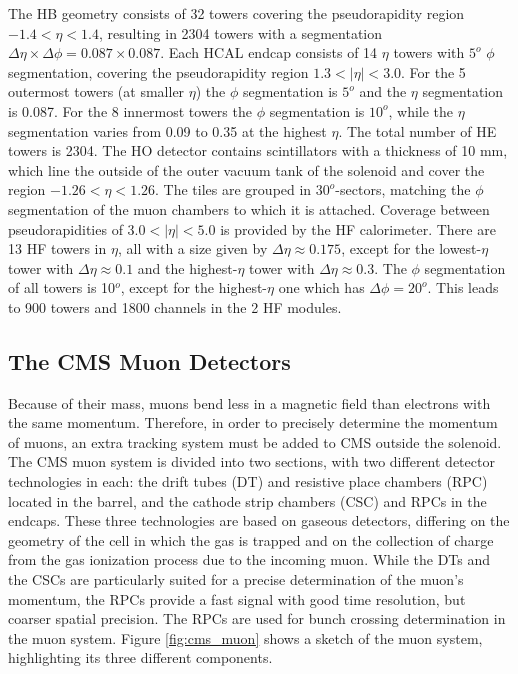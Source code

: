 The HB geometry consists of 32 towers covering the pseudorapidity region $-1.4 < \eta < 1.4$, resulting in 2304 towers with a segmentation $\Delta\eta\times\Delta\phi = 0.087\times0.087$.
Each HCAL endcap consists of 14 $\eta$ towers with $5^{o}$ $\phi$ segmentation, covering the pseudorapidity region $1.3 < |\eta| < 3.0$. 
For the 5 outermost towers (at smaller $\eta$) the $\phi$ segmentation is $5^{o}$ and the $\eta$ segmentation is 0.087. For the 8 innermost towers the $\phi$ segmentation is $10^{o}$, while the $\eta$ segmentation varies from 0.09 to 0.35 at the highest $\eta$. The total number of HE towers is 2304.
The HO detector contains scintillators with a thickness of 10 mm, which line the outside of the outer vacuum tank of the solenoid and cover the region $-1.26 < \eta < 1.26$. The tiles are grouped in $30^{o}$-sectors, matching the $\phi$ segmentation of the muon chambers to which it is attached. 
Coverage between pseudorapidities of $3.0 < |\eta| < 5.0$ is provided by the HF calorimeter. 
There are 13 HF towers in $\eta$, all with a size given by $\Delta\eta\approx0.175$, except for the lowest-$\eta$ tower with $\Delta\eta\approx0.1$ and the highest-$\eta$ tower with $\Delta\eta\approx0.3$. 
The $\phi$ segmentation of all towers is 10$^{o}$, except for the highest-$\eta$ one which has $\Delta\phi= 20^{o}$. 
This leads to 900 towers and 1800 channels in the 2 HF modules.

\subsection{The CMS Muon Detectors}

Because of their mass, muons bend less in a magnetic field than electrons with the same momentum. 
Therefore, in order to precisely determine the momentum of muons, an extra tracking system must be added to CMS outside the solenoid. 
The CMS muon system is divided into two sections, with two different detector technologies in each: the drift tubes (DT) and resistive place chambers (RPC) located in the barrel, and the cathode strip chambers (CSC) and RPCs in the endcaps. 
These three technologies are based on gaseous detectors, differing on the geometry of the cell in which the gas is trapped and on the collection of charge from the gas ionization process due to the incoming muon. 
While the DTs and the CSCs are particularly suited for a precise determination of the muon's momentum, the RPCs provide a fast signal with good time resolution, but coarser spatial precision. 
The RPCs are used for bunch crossing determination in the muon system. 
Figure \ref{fig:cms_muon} shows a sketch of the muon system, highlighting its three different components. 

